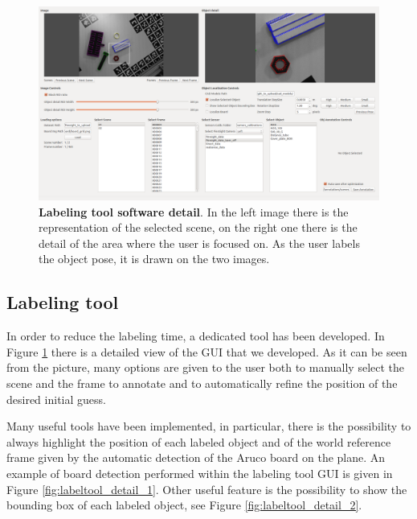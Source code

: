 \begin{figure}
    \centering
    \includegraphics[width=\textwidth]{figures/3_raw_dataset/labeltool_detail_0}
    \caption{\textbf{Labeling tool software detail}. In the left image there is the representation of the selected scene, on the right one there is the detail of the area where the user is focused on. As the user labels the object pose, it is drawn on the two images.}
    \label{fig:labeltool_detail_0}
\end{figure}

\subsection{Labeling tool}\label{subsec:raw_labeltool}
In order to reduce the labeling time, a dedicated tool has been developed. In Figure \ref{fig:labeltool_detail_0} there is a detailed view of the GUI that we developed. As it can be seen from the picture, many options are given to the user both to manually select the scene and the frame to annotate and to automatically refine the position of the desired initial guess.

Many useful tools have been implemented, in particular, there is the possibility to always highlight the position of each labeled object and of the world reference frame given by the automatic detection of the Aruco board on the plane. An example of board detection performed within the labeling tool GUI is given in Figure \ref{fig:labeltool_detail_1}. Other useful feature is the possibility to show the bounding box of each labeled object, see Figure \ref{fig:labeltool_detail_2}.

